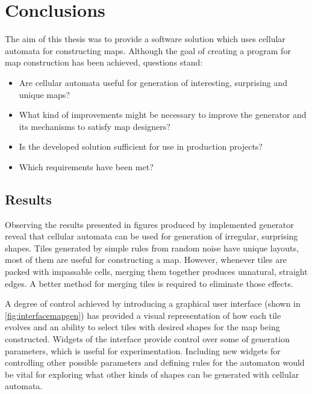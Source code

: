 \documentclass[12pt]{report}
\begin{document}
\chapter{Conclusions} \label{rozdzial.podsumowanie}

The aim of this thesis was to provide a software solution which uses cellular automata for constructing maps. Although the goal of creating a program for map construction has been achieved, questions stand: 

\begin{itemize}
	\item Are cellular automata useful for generation of interesting, surprising and unique maps?
	\item What kind of improvements might be necessary to improve the generator and its mechanisms to satisfy map designers? 
	\item Is the developed solution sufficient for use in production projects?  
	\item Which requirements have been met?
\end{itemize}


\section{Results}

Observing the results presented in figures produced by implemented generator reveal that cellular automata can be used for generation of irregular, surprising shapes. Tiles generated by simple rules from random noise have unique layouts, most of them are useful for constructing a map. However, whenever tiles are packed with impassable cells, merging them together produces unnatural, straight edges. A better method for merging tiles is required to eliminate those effects.

A degree of control achieved by introducing a graphical user interface (shown in \cref{fig:interfacemapgen}) has provided a visual representation of how each tile evolves and an ability to select tiles with desired shapes for the map being constructed. Widgets of the interface provide control over some of generation parameters, which is useful for experimentation. Including new widgets for controlling other possible parameters and defining rules for the automaton would be vital for exploring what other kinds of shapes can be generated with cellular automata. 
\end{document}
